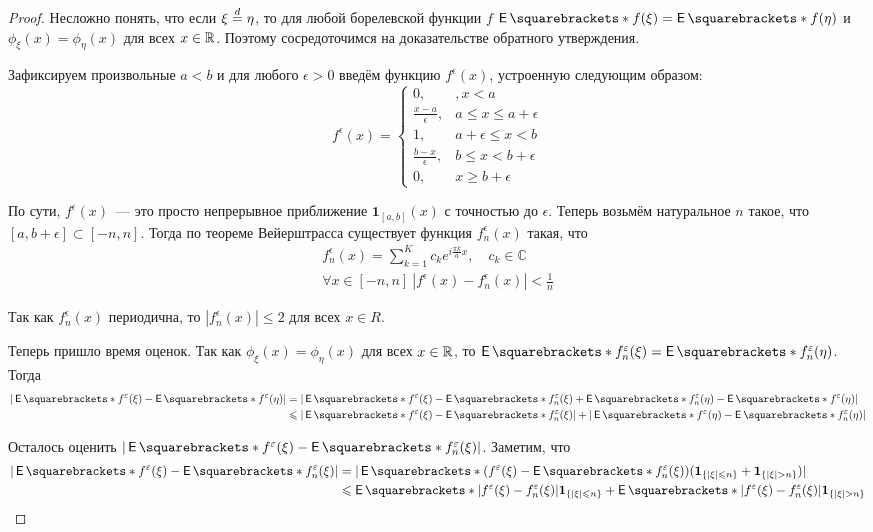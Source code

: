 \begin{proof}
	Несложно понять, что если \(\xi \overset{d}{=} \eta\), то для любой борелевской 
	функции \(f\) \(\E{f(\xi)} = \E{f(\eta)}\) и \(\phi_{\xi}(x) = 
	\phi_{\eta}(x)\) для всех \(x \in \mathbb{R}\). Поэтому сосредоточимся на 
	доказательстве обратного утверждения.
	
	Зафиксируем произвольные \(a < b\) и для любого \(\epsilon > 0\) введём 
	функцию \(f^{\epsilon}(x)\), устроенную следующим образом:
	\[
		f^{\epsilon}(x) = \begin{cases}
		0,&, x < a \\
		\frac{x - a}{\epsilon},& a \leq x \leq a + \epsilon \\
		1,& a + \epsilon \leq x < b \\
		\frac{b - x}{\epsilon},& b \leq x < b + \epsilon \\
		0, & x \geq b + \epsilon
		\end{cases}
	\]
	
	По сути, \(f^{\epsilon}(x)\)~--- это просто непрерывное приближение 
	\(\mathbf{1}_{[a, b]}(x)\) с точностью до \(\epsilon\). Теперь возьмём 
	натуральное \(n\) такое, что \([a, b + \epsilon] \subset [-n, n]\). Тогда 
	по теореме Вейерштрасса существует функция \(f_{n}^{\epsilon}(x)\) такая, 
	что
	\begin{gather*}
		f_{n}^{\epsilon}(x) = \sum_{k = 1}^{K} c_{k}e^{i\frac{\pi k}{a}x},\quad 
		c_{k} \in \mathbb{C} \\
		\forall x \in [-n, n]\ |f^{\epsilon}(x) - f_{n}^{\epsilon}(x)| < 
		\frac{1}{n}
	\end{gather*}

	Так как \(f_{n}^{\epsilon}(x)\) периодична, то \(|f_{n}^{\epsilon}(x)| \leq 
	2\) для всех \(x \in R\).
	
	Теперь пришло время оценок. Так как \(\phi_{\xi}(x) = \phi_{\eta}(x)\) для 
	всех \(x \in \mathbb{R}\), то \(\E{f_{n}^{\epsilon}(\xi)} = \E{ 
	f_{n}^{\epsilon}(\eta)}\). Тогда 
	\begin{align*}
		|\E{f^{\epsilon}(\xi)} - \E{f^{\epsilon}(\eta)}| &= 
		|\E{f^{\epsilon}(\xi)} - \E{f_{n}^{\epsilon}(\xi)} + \E{ 
		f_{n}^{\epsilon}(\eta)} - \E{f^{\epsilon}(\eta)}| \\
		&\leq |\E{f^{\epsilon}(\xi)} - \E{f_{n}^{\epsilon}(\xi)}| + 
		|\E{f^{\epsilon}(\eta)} - \E{ f_{n}^{\epsilon}(\eta)}|
	\end{align*}

	Осталось оценить \(|\E{f^{\epsilon}(\xi)} - \E{f_{n}^{\epsilon}(\xi)}|\). 	
	Заметим, что
	\begin{align*}
		|\E{f^{\epsilon}(\xi)} - \E{f_{n}^{\epsilon}(\xi)}| &= 
		|\E{(f^{\epsilon}(\xi)} - \E{f_{n}^{\epsilon}(\xi))(\mathbf{1}_{\{|\xi| 
		\leq n\}} + \mathbf{1}_{\{|\xi| > n\}})}|\\
		&\leq \E{|f^{\epsilon}(\xi) - f_{n}^{\epsilon}(\xi)| 
		\mathbf{1}_{\{|\xi| \leq n\}}} + \E{|f^{\epsilon}(\xi) - 
		f_{n}^{\epsilon}(\xi)| \mathbf{1}_{\{|\xi| > n\}}}
	\end{align*}


\end{proof}
